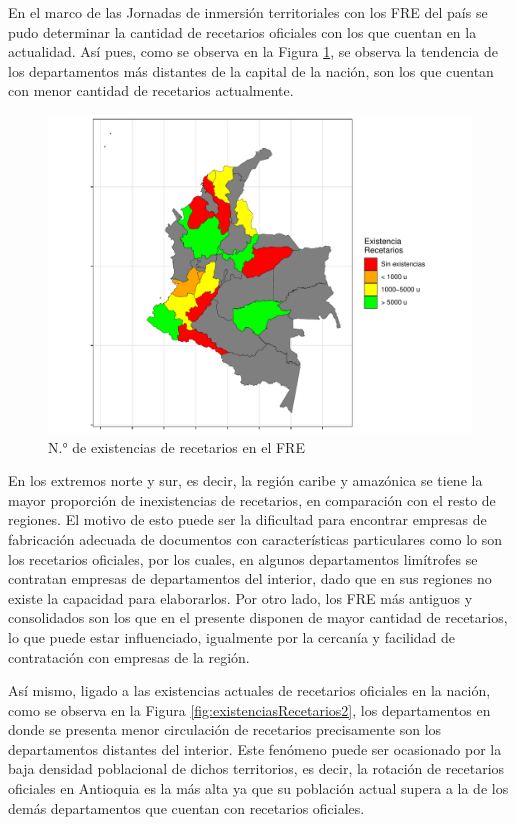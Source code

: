 \documentclass[
]{book}
\begin{document}
En el marco de las Jornadas de inmersión territoriales con los FRE del país se pudo determinar la cantidad de recetarios oficiales con los que cuentan en la actualidad. Así pues, como se observa en la Figura \ref{fig:existenciasRecetarios}, se observa la tendencia de los departamentos más distantes de la capital de la nación, son los que cuentan con menor cantidad de recetarios actualmente.

\begin{figure}
\includegraphics[width=0.85\linewidth]{InformeFinal_files/figure-latex/existenciasRecetarios-1} \caption{N.° de existencias de recetarios en el FRE}\label{fig:existenciasRecetarios}
\end{figure}

En los extremos norte y sur, es decir, la región caribe y amazónica se tiene la mayor proporción de inexistencias de recetarios, en comparación con el resto de regiones. El motivo de esto puede ser la dificultad para encontrar empresas de fabricación adecuada de documentos con características particulares como lo son los recetarios oficiales, por los cuales, en algunos departamentos limítrofes se contratan empresas de departamentos del interior, dado que en sus regiones no existe la capacidad para elaborarlos. Por otro lado, los FRE más antiguos y consolidados son los que en el presente disponen de mayor cantidad de recetarios, lo que puede estar influenciado, igualmente por la cercanía y facilidad de contratación con empresas de la región.

Así mismo, ligado a las existencias actuales de recetarios oficiales en la nación, como se observa en la Figura \ref{fig:existenciasRecetarios2}, los departamentos en donde se presenta menor circulación de recetarios precisamente son los departamentos distantes del interior. Este fenómeno puede ser ocasionado por la baja densidad poblacional de dichos territorios, es decir, la rotación de recetarios oficiales en Antioquia es la más alta ya que su población actual supera a la de los demás departamentos que cuentan con recetarios oficiales.
\end{document}
